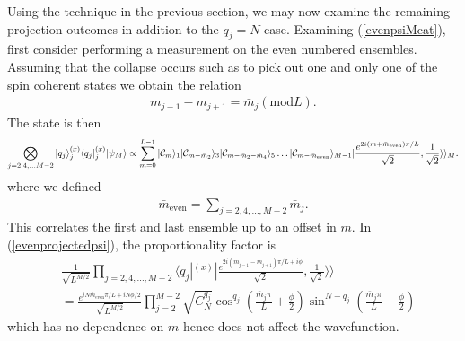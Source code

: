 \documentclass{WileyMSP-template}
\begin{document}
Using the technique in the previous section, we may now examine the remaining projection outcomes in addition to the $ q_j = N $ case.  Examining  (\ref{evenpsiMcat}), first consider performing a measurement on the even numbered ensembles.  Assuming that the collapse occurs such as to pick out one and only one of the spin coherent states we obtain the relation
%
\begin{align}
    m_{j-1} - m_{j+1} = \bar{m}_j (\text{mod} L) .
\end{align}
%
The state is then
%
\begin{equation}
 \bigotimes_{j=2,4,\dots M-2} |q_j \rangle_j^{(x)} \langle q_j |_j^{(x)}  |\psi_M \rangle \propto \nonumber
\sum_{m=0}^{L-1} | {\cal C}_{m}  \rangle_1 | {\cal C}_{m - \bar{m}_2}  \rangle_3 | {\cal C}_{m - \bar{m}_2 - \bar{m}_4}  \rangle_5 \dots | {\cal C}_{m - \bar{m}_{\text{even}}}  \rangle_{M-1} \nonumber
  |\frac{e^{2 i (m+ \bar{m}_{\text{even}})  \pi/L }}{\sqrt{2}},\frac{1}{\sqrt{2}}\rangle\rangle_{M}  .
 \label{evenprojectedpsi}
\end{equation}
%
where we defined
%
\begin{align}
\bar{m}_\text{even} =
\sum_{j=2,4, \dots, M-2} \bar{m}_j .
\end{align}
%
This correlates the first and last ensemble up to an offset in $ m $. In (\ref{evenprojectedpsi}), the proportionality factor is
%
\begin{align}
& \frac{1}{\sqrt{L^{M/2}}} \prod_{j=2,4,\dots, M-2} \langle q_j|^{(x)} | \frac{e^{2i (m_{j-1} - m_{j+1} ) \pi/L + i \phi }}{\sqrt{2}}, \frac{1}{\sqrt{2}} \rangle \rangle\nonumber \\
& = \frac{e^{iN \bar{m}_\text{even} \pi /L + iN \phi/2} }{\sqrt{L^{M/2}}} \prod_{j=2}^{M-2}  \sqrt{C_N^{q_j}} \cos^{q_j} ( \frac{\bar{m}_j \pi}{L} + \frac{\phi}{2} )\sin^{N-q_j} ( \frac{\bar{m}_j \pi}{L} + \frac{\phi}{2} )
\end{align}
%
which has no dependence on $ m $ hence does not affect the wavefunction.
\end{document}

